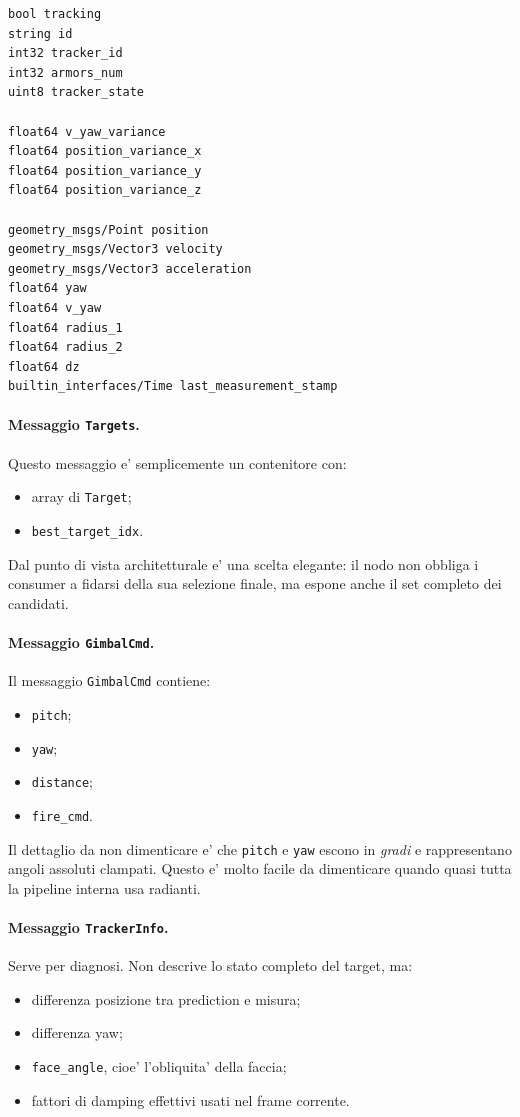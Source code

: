 \documentclass[11pt,a4paper]{article}
\newcommand{\code}[1]{\texttt{#1}}
\begin{document}
\begin{lstlisting}[style=shellstyle,caption={Estratto semantico del messaggio Target}]
bool tracking
string id
int32 tracker_id
int32 armors_num
uint8 tracker_state

float64 v_yaw_variance
float64 position_variance_x
float64 position_variance_y
float64 position_variance_z

geometry_msgs/Point position
geometry_msgs/Vector3 velocity
geometry_msgs/Vector3 acceleration
float64 yaw
float64 v_yaw
float64 radius_1
float64 radius_2
float64 dz
builtin_interfaces/Time last_measurement_stamp
\end{lstlisting}

\paragraph{Messaggio \code{Targets}.}
Questo messaggio e' semplicemente un contenitore con:
\begin{itemize}[leftmargin=1.4em]
  \item array di \code{Target};
  \item \code{best\_target\_idx}.
\end{itemize}

Dal punto di vista architetturale e' una scelta elegante: il nodo non obbliga i consumer a fidarsi della sua selezione finale, ma espone anche il set completo dei candidati.

\paragraph{Messaggio \code{GimbalCmd}.}
Il messaggio \code{GimbalCmd} contiene:
\begin{itemize}[leftmargin=1.4em]
  \item \code{pitch};
  \item \code{yaw};
  \item \code{distance};
  \item \code{fire\_cmd}.
\end{itemize}

Il dettaglio da non dimenticare e' che \code{pitch} e \code{yaw} escono in \emph{gradi} e rappresentano angoli assoluti clampati. Questo e' molto facile da dimenticare quando quasi tutta la pipeline interna usa radianti.

\paragraph{Messaggio \code{TrackerInfo}.}
Serve per diagnosi. Non descrive lo stato completo del target, ma:
\begin{itemize}[leftmargin=1.4em]
  \item differenza posizione tra prediction e misura;
  \item differenza yaw;
  \item \code{face\_angle}, cioe' l'obliquita' della faccia;
  \item fattori di damping effettivi usati nel frame corrente.
\end{itemize}
\end{document}
